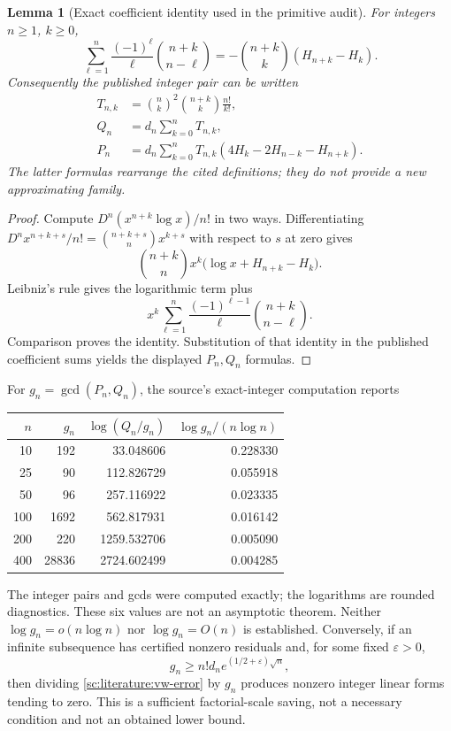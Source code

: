 \documentclass[11pt,a4paper]{article}
\newtheorem{lemma}[theorem]{Lemma}
\theoremstyle{definition}
\theoremstyle{remark}
\theoremstyle{plain}
\numberwithin{equation}{section}
\begin{document}
\begin{lemma}[Exact coefficient identity used in the primitive audit]
\label{sc:literature:vw-identity}
For integers $n\ge1$, $k\ge0$,
\[
\sum_{\ell=1}^{n}\frac{(-1)^\ell}{\ell}
\binom{n+k}{n-\ell}
=-\binom{n+k}{k}(H_{n+k}-H_k).
\]
Consequently the published integer pair can be written
\begin{align*}
T_{n,k}&=\binom nk^2\binom{n+k}{k}\frac{n!}{k!},\\
Q_n&=d_n\sum_{k=0}^{n}T_{n,k},\\
P_n&=d_n\sum_{k=0}^{n}T_{n,k}
 (4H_k-2H_{n-k}-H_{n+k}).
\end{align*}
The latter formulas rearrange the cited definitions; they do not
provide a new approximating family.
\end{lemma}
\begin{proof}
Compute $D^n(x^{n+k}\log x)/n!$ in two ways. Differentiating
$D^n x^{n+k+s}/n!=\binom{n+k+s}{n}x^{k+s}$ with respect to $s$
at zero gives
\[
\binom{n+k}{n}x^k
 \bigl(\log x+H_{n+k}-H_k\bigr).
\]
Leibniz's rule gives the logarithmic term plus
\[
x^k\sum_{\ell=1}^n
 \frac{(-1)^{\ell-1}}{\ell}\binom{n+k}{n-\ell}.
\]
Comparison proves the identity. Substitution of that identity in the
published coefficient sums yields the displayed $P_n,Q_n$ formulas.
\end{proof}

For $g_n=\gcd(P_n,Q_n)$, the source's exact-integer computation reports
\begin{center}
\begin{tabular}{r r r r}
\toprule
$n$&$g_n$&$\log(Q_n/g_n)$&$\log g_n/(n\log n)$\\
\midrule
10&192&33.048606&0.228330\\
25&90&112.826729&0.055918\\
50&96&257.116922&0.023335\\
100&1692&562.817931&0.016142\\
200&220&1259.532706&0.005090\\
400&28836&2724.602499&0.004285\\
\bottomrule
\end{tabular}
\end{center}
The integer pairs and gcds were computed exactly; the logarithms are
rounded diagnostics. These six values are not an asymptotic theorem.
Neither $\log g_n=o(n\log n)$ nor $\log g_n=O(n)$ is established.
Conversely, if an infinite subsequence has certified nonzero residuals
and, for some fixed $\varepsilon>0$,
\[
g_n\ge n!d_n e^{(1/2+\varepsilon)\sqrt n},
\]
then dividing \eqref{sc:literature:vw-error} by $g_n$ produces nonzero
integer linear forms tending to zero. This is a sufficient
factorial-scale saving, not a necessary condition and not an obtained
lower bound.
\end{document}

